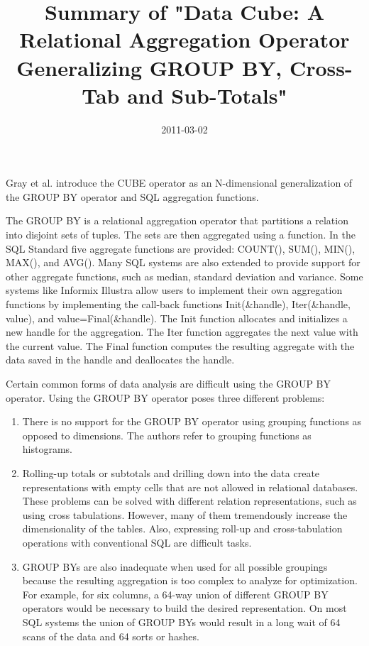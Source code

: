 \documentclass[]{article}
\title{Summary of "Data Cube: A Relational Aggregation Operator Generalizing GROUP BY, Cross-Tab and Sub-Totals"}
\author{  }
\date{2011-03-02}
\begin{document}
\ifpdf
{}
\else
{}
\fi

\maketitle

Gray et al. introduce the CUBE operator as an N-dimensional generalization of the GROUP BY operator and SQL aggregation
functions.

The GROUP BY is a relational aggregation operator that partitions a relation into disjoint sets of tuples. The sets are then
aggregated using a function. In the SQL Standard five aggregate functions are provided: COUNT(), SUM(), MIN(), MAX(), and
AVG(). Many SQL systems are also extended to provide support for other aggregate functions, such as median, standard deviation
and variance. Some systems like Informix Illustra allow users to implement their own aggregation functions by implementing the
call-back functions Init(\&handle), Iter(\&handle, value), and value=Final(\&handle). The Init function allocates and
initializes a new handle for the aggregation. The Iter function aggregates the next value with the current value. The Final
function computes the resulting aggregate with the data saved in the handle and deallocates the handle.

Certain common forms of data analysis are difficult using the GROUP BY operator. Using the GROUP BY operator poses three
different problems:

\begin{enumerate}
    \item There is no support for the GROUP BY operator using grouping functions as opposed to dimensions. The authors refer
    to grouping functions as histograms.
    \item Rolling-up totals or subtotals and drilling down into the data create representations with empty cells that are not
    allowed in relational databases. These problems can be solved with different relation representations, such as using cross
    tabulations. However, many of them tremendously increase the dimensionality of the tables. Also, expressing roll-up and
    cross-tabulation operations with conventional SQL are difficult tasks.
    \item GROUP BYs are also inadequate when used for all possible groupings because the resulting aggregation is too complex
    to analyze for optimization. For example, for six columns, a 64-way union of different GROUP BY operators would be
    necessary to build the desired representation. On most SQL systems the union of GROUP BYs would result in a long wait of
    64 scans of the data and 64 sorts or hashes.
\end{enumerate}
\end{document}
